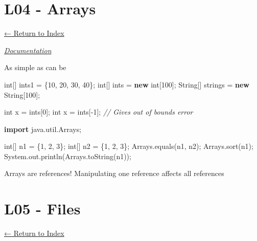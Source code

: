\documentclass[]{article}
\newenvironment{Shaded}{}{}
\newcommand{\BuiltInTok}[1]{#1}
\newcommand{\CommentTok}[1]{\textcolor[rgb]{0.38,0.63,0.69}{\textit{#1}}}
\newcommand{\DataTypeTok}[1]{\textcolor[rgb]{0.56,0.13,0.00}{#1}}
\newcommand{\DecValTok}[1]{\textcolor[rgb]{0.25,0.63,0.44}{#1}}
\newcommand{\FunctionTok}[1]{\textcolor[rgb]{0.02,0.16,0.49}{#1}}
\newcommand{\ImportTok}[1]{#1}
\newcommand{\KeywordTok}[1]{\textcolor[rgb]{0.00,0.44,0.13}{\textbf{#1}}}
\newcommand{\NormalTok}[1]{#1}
\begin{document}
\hypertarget{l04---arrays}{%
\section{L04 - Arrays}\label{l04---arrays}}

\protect\hyperlink{table-of-contents}{← Return to Index}

\emph{\href{https://docs.oracle.com/javase/8/docs/api/java/util/Arrays.html}{Documentation}}

As simple as can be

\begin{Shaded}
\begin{Highlighting}[]
\DataTypeTok{int}\NormalTok{[] ints1 = \{}\DecValTok{10}\NormalTok{, }\DecValTok{20}\NormalTok{, }\DecValTok{30}\NormalTok{, }\DecValTok{40}\NormalTok{\};}
\DataTypeTok{int}\NormalTok{[] ints = }\KeywordTok{new} \DataTypeTok{int}\NormalTok{[}\DecValTok{100}\NormalTok{];}
\BuiltInTok{String}\NormalTok{[] strings = }\KeywordTok{new} \BuiltInTok{String}\NormalTok{[}\DecValTok{100}\NormalTok{];}

\DataTypeTok{int}\NormalTok{ x = ints[}\DecValTok{0}\NormalTok{];}
\DataTypeTok{int}\NormalTok{ x = ints[-}\DecValTok{1}\NormalTok{]; }\CommentTok{// Gives out of bounds error}

\KeywordTok{import}\ImportTok{ java.util.Arrays;}

\DataTypeTok{int}\NormalTok{[] n1 = \{}\DecValTok{1}\NormalTok{, }\DecValTok{2}\NormalTok{, }\DecValTok{3}\NormalTok{\};}
\DataTypeTok{int}\NormalTok{[] n2 = \{}\DecValTok{1}\NormalTok{, }\DecValTok{2}\NormalTok{, }\DecValTok{3}\NormalTok{\};}
\BuiltInTok{Arrays}\NormalTok{.}\FunctionTok{equals}\NormalTok{(n1, n2);}
\BuiltInTok{Arrays}\NormalTok{.}\FunctionTok{sort}\NormalTok{(n1);}
\BuiltInTok{System}\NormalTok{.}\FunctionTok{out}\NormalTok{.}\FunctionTok{println}\NormalTok{(}\BuiltInTok{Arrays}\NormalTok{.}\FunctionTok{toString}\NormalTok{(n1));}
\end{Highlighting}
\end{Shaded}

Arrays are references! Manipulating one reference affects all references

\hypertarget{l05---files}{%
\section{L05 - Files}\label{l05---files}}

\protect\hyperlink{table-of-contents}{← Return to Index}
\end{document}
